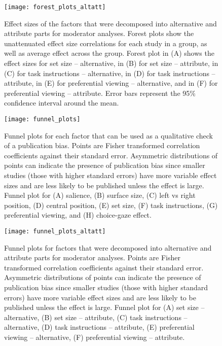 
\clearpage

\begin{figure}%
\texttt{[image: forest\_plots\_altatt]}
\centering
\singlespace
\caption{Effect sizes of the factors that were decomposed into alternative and attribute parts for moderator analyses. Forest plots show the unattenuated effect size correlations for each study in a group, as well as average effect across the group. Forest plot in (A) shows the effect sizes for set size -- alternative, in (B) for set size -- attribute, in (C) for task instructions -- alternative, in (D) for task instructions -- attribute, in (E) for preferential viewing -- alternative, and in (F) for preferential viewing -- attribute. Error bars represent the 95\% confidence interval around the mean.}
\label{fig:forest_plots_altatt}
\end{figure}
\clearpage

\begin{figure}[!h]
\texttt{[image: funnel\_plots]}
\centering
\caption{Funnel plots for each factor that can be used as a qualitative check of a publication bias. Points are Fisher transformed correlation coefficients against their standard error. Asymmetric distributions of points can indicate the presence of publication bias since smaller studies (those with higher standard errors) have more variable effect sizes and are less likely to be published unless the effect is large. Funnel plot for (A) salience, (B) surface size, (C) left vs right position, (D) central position, (E) set size, (F) task instructions, (G) preferential viewing, and (H) choice-gaze effect.}
\label{fig:funnel_plots}
\end{figure}

\begin{figure}%
\texttt{[image: funnel\_plots\_altatt]}
\centering
\singlespace
\caption{Funnel plots for factors that were decomposed into alternative and attribute parts for moderator analyses. Points are Fisher transformed correlation coefficients against their standard error. Asymmetric distributions of points can indicate the presence of publication bias since smaller studies (those with higher standard errors) have more variable effect sizes and are less likely to be published unless the effect is large. Funnel plot for (A) set size -- alternative, (B) set size -- attribute, (C) task instructions -- alternative, (D) task instructions -- attribute, (E) preferential viewing -- alternative, (F) preferential viewing -- attribute.}
\label{fig:funnel_plots_altatt}
\end{figure}
\clearpage


\clearpage